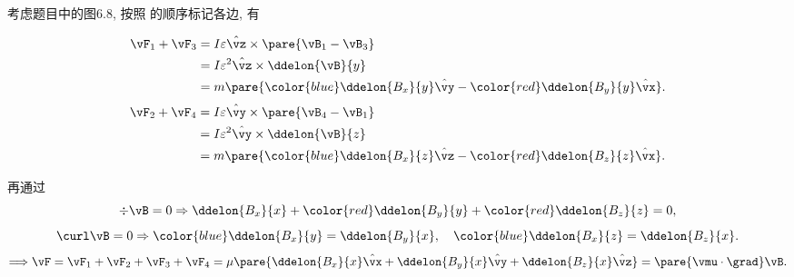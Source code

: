 \documentclass{ctexart}
\begin{document}
	
考虑题目中的图6.8, 按照
的顺序标记各边, 有
\begin{multicols}{2}
\noindent
\begin{align*}
\vF_1 + \vF_3 &= I\varepsilon \hat{\vz}\times\pare{\vB_1-\vB_3} \\
&= I\varepsilon^2\hat{\vz}\times\ddelon{\vB}{y} \\
&= m\pare{{\color{blue}\ddelon{B_x}{y}}\hat{\vy} - {\color{red}\ddelon{B_y}{y}}\hat{\vx}}.
\end{align*}
\begin{align*}
\vF_2 + \vF_4 &= I\varepsilon \hat{\vy}\times\pare{\vB_4-\vB_1} \\
&= I\varepsilon^2\hat{\vy}\times\ddelon{\vB}{z} \\
&= m\pare{{\color{blue}\ddelon{B_x}{z}}\hat{\vz} - {\color{red}\ddelon{B_z}{z}}\hat{\vx}}.
\end{align*}
\end{multicols}
再通过
\[ \div \vB = 0 \Rightarrow {\ddelon{B_x}{x}} + {\color{red}\ddelon{B_y}{y}} + {\color{red}\ddelon{B_z}{z}} = 0, \]
\[ \curl \vB = 0 \Rightarrow {\color{blue}\ddelon{B_x}{y}} = {\ddelon{B_y}{x}},\quad {\color{blue}\ddelon{B_x}{z}}={\ddelon{B_z}{x}}. \]
\[ \Longrightarrow \vF = \vF_1 + \vF_2 + \vF_3 + \vF_4 = \mu \pare{\ddelon{B_x}{x}\hat{\vx}+\ddelon{B_y}{x}\hat{\vy}+\ddelon{B_z}{x}\hat{\vz}} = \pare{\vmu\cdot\grad}\vB. \]
\end{document}
